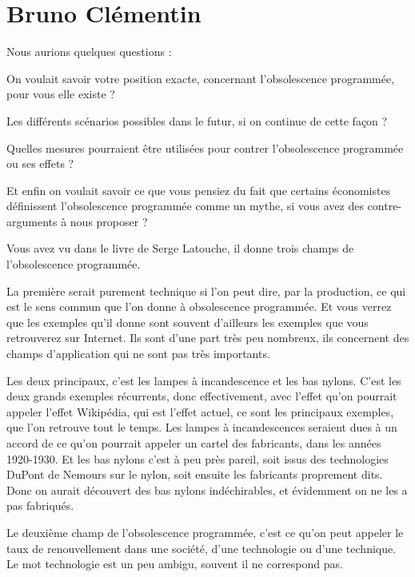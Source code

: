 \section{Bruno Clémentin}
\label{InterviewBClémentin}
\begin{description}

Nous aurions quelques questions : 

On voulait savoir votre position exacte, concernant l’obsolescence programmée, pour vous elle existe ?

Les différents scénarios possibles dans le futur, si on continue de cette façon ?

Quelles mesures pourraient être utilisées pour contrer l’obsolescence programmée ou ses effets ?

Et enfin on voulait savoir ce que vous pensiez du fait que certains économistes définissent l’obsolescence programmée comme un mythe, si vous avez des contre-arguments à nous proposer ?	

\item[Bruno Clémentin]Vous avez vu dans le livre de Serge Latouche, il donne trois champs de l'obsolescence programmée.
 
La première serait purement technique si l'on peut dire, par la production, ce qui est le sens commun que l'on donne à obsolescence programmée. Et vous verrez que les exemples qu'il donne sont souvent d'ailleurs les exemples que vous retrouverez sur Internet. Ils sont d'une part très peu nombreux, ils concernent des champs d'application qui ne sont pas très importants.
 
Les deux principaux, c'est les lampes à incandescence et les bas nylons. C'est les deux grands exemples récurrents, donc effectivement, avec l'effet qu'on pourrait appeler l'effet Wikipédia, qui est l'effet actuel, ce sont les principaux exemples, que l'on retrouve tout le temps.
Les lampes à incandescences seraient dues à un accord de ce qu'on pourrait appeler un cartel des fabricants, dans les années 1920-1930.
Et les bas nylons c'est à peu près pareil, soit issus des technologies DuPont de Nemours sur le nylon, soit ensuite les fabricants proprement dits. Donc on aurait découvert des bas nylons indéchirables, et évidemment on ne les a pas fabriqués.

Le deuxième champ de l'obsolescence programmée, c'est ce qu'on peut appeler le taux de renouvellement dans une société, d'une technologie ou d'une technique. Le mot technologie est un peu ambigu, souvent il ne correspond pas.


\end{description}
